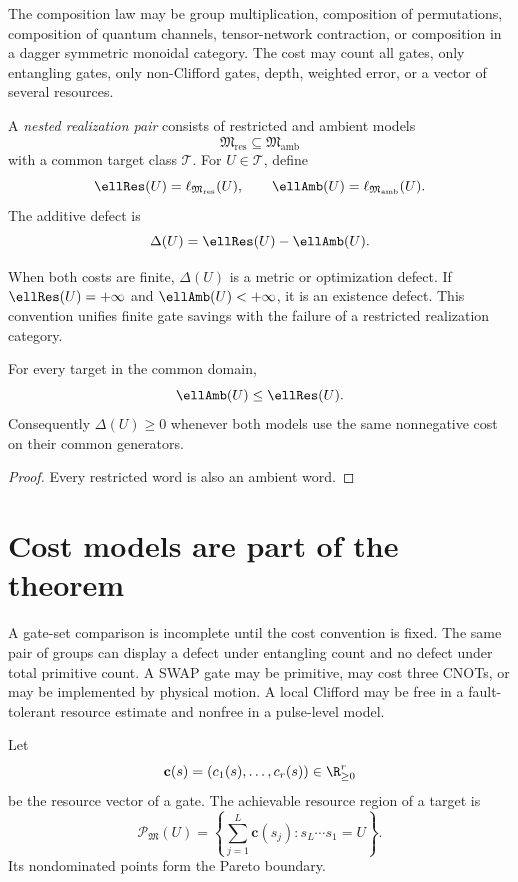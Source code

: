 The composition law may be group multiplication, composition of permutations, composition of quantum channels, tensor-network contraction, or composition in a dagger symmetric monoidal category.  The cost may count all gates, only entangling gates, only non-Clifford gates, depth, weighted error, or a vector of several resources.

\begin{definition}
A \emph{nested realization pair} consists of restricted and ambient models
\[
\mathfrak M_{\mathrm{res}}\subseteq\mathfrak M_{\mathrm{amb}}
\]
with a common target class $\mathcal T$.  For $U\in\mathcal T$, define
\[
\ellRes(U)=\ell_{\mathfrak M_{\mathrm{res}}}(U),
\qquad
\ellAmb(U)=\ell_{\mathfrak M_{\mathrm{amb}}}(U).
\]
The additive defect is
\[
\Delta(U)=\ellRes(U)-\ellAmb(U).
\]
\end{definition}

When both costs are finite, $\Delta(U)$ is a metric or optimization defect.  If $\ellRes(U)=+\infty$ and $\ellAmb(U)<+\infty$, it is an existence defect.  This convention unifies finite gate savings with the failure of a restricted realization category.

\begin{proposition}[Monotonicity]
For every target in the common domain,
\[
\ellAmb(U)\le \ellRes(U).
\]
Consequently $\Delta(U)\ge0$ whenever both models use the same nonnegative cost on their common generators.
\end{proposition}
\begin{proof}
Every restricted word is also an ambient word.
\end{proof}

\section{Cost models are part of the theorem}
A gate-set comparison is incomplete until the cost convention is fixed.  The same pair of groups can display a defect under entangling count and no defect under total primitive count.  A SWAP gate may be primitive, may cost three CNOTs, or may be implemented by physical motion.  A local Clifford may be free in a fault-tolerant resource estimate and nonfree in a pulse-level model.

\begin{definition}
Let
\[
\mathbf c(s)=(c_1(s),\ldots,c_r(s))\in\R_{\ge0}^r
\]
be the resource vector of a gate.  The achievable resource region of a target is
\[
\mathcal P_{\mathfrak M}(U)
=
\left\{
\sum_{j=1}^L\mathbf c(s_j):s_L\cdots s_1=U
\right\}.
\]
Its nondominated points form the Pareto boundary.
\end{definition}

